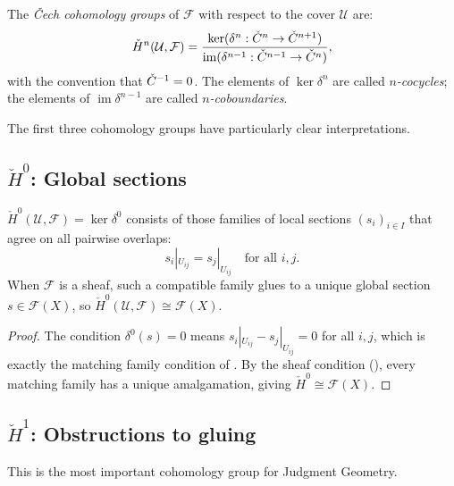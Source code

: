\begin{definition}
\label{def:cech-cohomology}
The \emph{\v{C}ech cohomology groups} of $\mathcal{F}$ with respect to
the cover $\mathcal{U}$ are:
\[
  \check{H}^n(\mathcal{U}, \mathcal{F})
  = \frac{\ker(\delta^n : \check{C}^n \to \check{C}^{n+1})}
         {\operatorname{im}(\delta^{n-1} : \check{C}^{n-1} \to \check{C}^n)},
\]
with the convention that $\check{C}^{-1} = 0$.  The elements of
$\ker \delta^n$ are called \emph{$n$-cocycles}; the elements of
$\operatorname{im} \delta^{n-1}$ are called \emph{$n$-coboundaries}.
\end{definition}

The first three cohomology groups have particularly clear
interpretations.

\subsection{\texorpdfstring{$\check{H}^0$}{H0}: Global sections}
\label{sec:cech:h0}

\begin{proposition}
\label{prop:h0-global-sections}
$\check{H}^0(\mathcal{U}, \mathcal{F}) = \ker \delta^0$
consists of those families of local sections $(s_i)_{i \in I}$
that agree on all pairwise overlaps:
\[
  s_i|_{U_{ij}} = s_j|_{U_{ij}} \quad \text{for all } i, j.
\]
When $\mathcal{F}$ is a sheaf, such a compatible family glues to a
unique global section $s \in \mathcal{F}(X)$, so
$\check{H}^0(\mathcal{U}, \mathcal{F}) \cong \mathcal{F}(X)$.
\end{proposition}

\begin{proof}
The condition $\delta^0(s) = 0$ means $s_i|_{U_{ij}} - s_j|_{U_{ij}} = 0$
for all $i, j$, which is exactly the matching family condition of
.  By the sheaf condition
(), every matching family has a unique amalgamation,
giving $\check{H}^0 \cong \mathcal{F}(X)$.
\end{proof}

\subsection{\texorpdfstring{$\check{H}^1$}{H1}: Obstructions to gluing}
\label{sec:cech:h1}

This is the most important cohomology group for Judgment Geometry.

